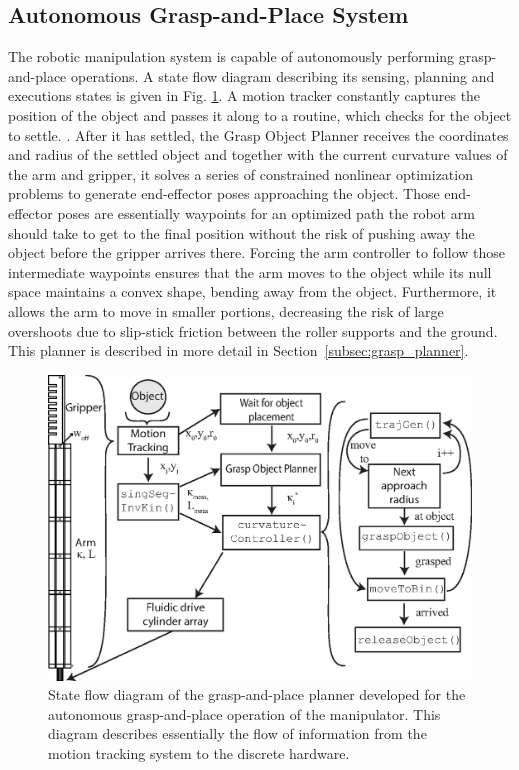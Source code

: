 \subsection{Autonomous Grasp-and-Place System}
\label{subsec:grasp-place-planner}
The robotic manipulation system is capable of autonomously performing grasp-and-place operations. 
A state flow diagram describing its sensing, planning and executions states is given in Fig. \ref{fig:grasp-and-place-planner}. 
A motion tracker constantly captures the position of the object and passes it along to a routine, which checks for the object to settle.
.
After it has settled, the Grasp Object Planner receives the coordinates and radius of the settled object and together with the current curvature values of the arm and gripper, it solves a series of constrained nonlinear optimization problems to generate end-effector poses approaching the object.
Those end-effector poses are essentially waypoints for an optimized path the robot arm should take to get to the final position without the risk of pushing away the object before the gripper arrives there. 
Forcing the arm controller to follow those intermediate waypoints ensures that the arm moves to the object while its null space maintains a convex shape, bending away from the object. 
Furthermore, it allows the arm to move in smaller portions, decreasing the risk of large overshoots due to slip-stick friction between the roller supports and the ground.
This planner is described in more detail in Section~\ref{subsec:grasp_planner}.

\begin{figure}[!htb]
\centering
   \includegraphics[width=0.95\columnwidth]{Figures/processing_control/grasp_place_planner.eps}
   \caption{State flow diagram of the grasp-and-place planner developed for the autonomous grasp-and-place operation of the manipulator. This diagram describes essentially the flow of information from the motion tracking system to the discrete hardware.}
   \label{fig:grasp-and-place-planner}
\end{figure}

